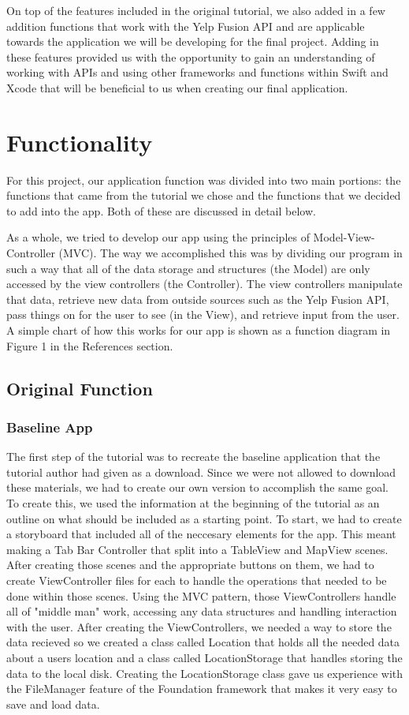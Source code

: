 \documentclass[conference]{IEEEtran}
\begin{document}
On top of the features included in the original tutorial, we also added in a few 
addition functions that work with the Yelp Fusion API and are applicable towards 
the application we will be developing for the final project. Adding in these features
provided us with the opportunity to gain an understanding of working with APIs and
using other frameworks and functions within Swift and Xcode that will be beneficial
to us when creating our final application.

\section{Functionality}
For this project, our application function was divided into two main portions:
the functions that came from the tutorial we chose and the functions that we decided
to add into the app. Both of these are discussed in detail below.

As a whole, we tried to develop our app using the principles of Model-View-Controller 
(MVC). The way we accomplished this was by dividing our program in such a way that 
all of the data storage and structures (the Model) are only accessed by the view
controllers (the Controller). The view controllers manipulate that data, 
retrieve new data from outside sources such as the Yelp Fusion API, pass things on
for the user to see (in the View), and retrieve input from the user. A simple
chart of how this works for our app is shown as a function diagram in Figure 1
in the References section.

\subsection{Original Function}

\subsubsection{Baseline App}
The first step of the tutorial was to recreate the baseline application that the
tutorial author had given as a download. Since we were not allowed to download
these materials, we had to create our own version to accomplish the same goal.
To create this, we used the information at the beginning of the tutorial as an
outline on what should be included as a starting point. To start, we had to create
a storyboard that included all of the neccesary elements for the app. This meant 
making a Tab Bar Controller that split into a TableView and MapView scenes. After 
creating those scenes and the appropriate buttons on them, we had to create 
ViewController files for each to handle the operations that needed to be done within
those scenes. Using the MVC pattern, those ViewControllers handle all of "middle man"
work, accessing any data structures and handling interaction with the user. After
creating the ViewControllers, we needed a way to store the data recieved so we created
a class called Location that holds all the needed data about a users location and
a class called LocationStorage that handles storing the data to the local disk.
Creating the LocationStorage class gave us experience with the FileManager feature
of the Foundation framework that makes it very easy to save and load data.
\end{document}
